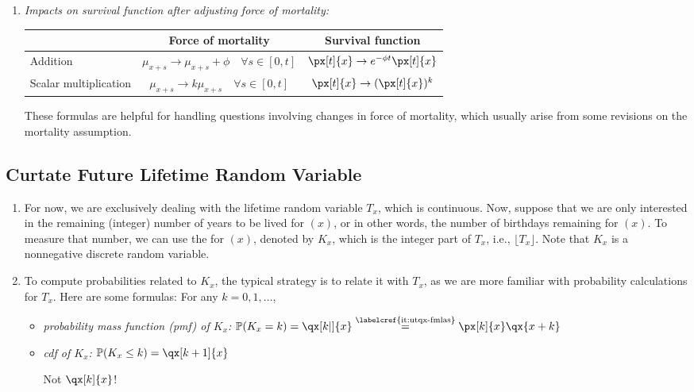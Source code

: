 \begin{enumerate}
\begin{enumerate}
Verbal interpretation of this formula is easier after multiplying both sides by
a small \(\Delta t\), resulting in:
\[
\underbrace{f_x(t)\Delta t}_{\text{\(\approx\) prob.\ that \(T_x\in[t, t+\Delta t]\)}}
=\underbrace{\px[t]{x}}_{\text{survive \(t\) yrs.}}\times 
\underbrace{\mu_{x+t}\Delta t}_{\text{\(\approx\) die in the subsequent \(\Delta t\) yrs.}}.
\]
\item \label{it:fom-change-impact} \emph{Impacts on survival function after
adjusting force of mortality:}
\begin{center}
\begin{tabular}{lcc}
\toprule
&Force of mortality&Survival function \\
\midrule
Addition&\(\mu_{x+s}\to\mu_{x+s}+\phi\quad\forall s\in[0,t]\)&\(\px[t]{x}\to e^{-\phi t}\px[t]{x}\) \\
Scalar multiplication&\(\mu_{x+s}\to k\mu_{x+s}\quad\forall s\in[0,t]\)&\(\px[t]{x}\to(\px[t]{x})^{k}\) \\
\bottomrule
\end{tabular}
\end{center}
\begin{note}
These formulas are helpful for handling questions involving changes in force of
mortality, which usually arise from some revisions on the mortality assumption.
\end{note}
\end{enumerate}
\end{enumerate}

\subsection{Curtate Future Lifetime Random Variable}
\begin{enumerate}
\item For now, we are exclusively dealing with the lifetime random variable
\(T_x\), which is continuous. Now, suppose that we are only interested in the
remaining (integer) number of years to be lived for \((x)\), or in other words,
the number of birthdays remaining for \((x)\). To measure that number, we can
use the  for \((x)\), denoted by
\(K_x\), which is the integer part of \(T_x\), i.e., \(\lfloor T_x\rfloor\).
Note that \(K_x\) is a nonnegative discrete random variable.

\item To compute probabilities related to \(K_x\), the typical strategy is to
relate it with \(T_x\), as we are more familiar with probability calculations
for \(T_x\). Here are some formulas: For any \(k=0,1,\dotsc\),
\begin{itemize}
\item \label{it:pmf-kx} \emph{probability mass function (pmf) of \(K_x\):}
\(\prob{K_x=k}=\qx[k|]{x}\overset{\text{\labelcref{it:utqx-fmlas}}}{=}\px[k]{x}\qx{x+k}\)
\item \label{it:cdf-kx} \emph{cdf of \(K_x\):}
\(\prob{K_x\le k}=\qx[k+1]{x}\) \begin{warning}
Not \(\qx[k]{x}\)!
\end{warning}
\end{itemize}
\end{enumerate}

